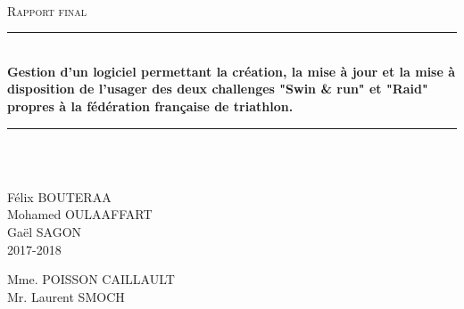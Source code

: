 \documentclass[12pt,a4paper]{report}
\newcommand{\HRule}{\rule{\linewidth}{0.5mm}}
\begin{document}
	
\begin{titlepage}
	\begin{sffamily}
		\begin{center}
			\begin{figure}
				
			\end{figure}
			
			\\[1cm]
			
			\textsc{\Large Rapport final}\\[1.5cm]
			
			\HRule \\[0.4cm]
			{ \huge \bfseries Gestion d'un logiciel permettant la création, la mise à jour et la mise à disposition de l'usager des deux challenges "Swin \& run" et "Raid" propres à la fédération française de triathlon. \\[0.4cm] }
			\HRule \\[1.5cm]
			
			\\[5cm]
			
			
			\begin{flushleft}
				Félix BOUTERAA \\
				Mohamed OULAAFFART \\
				Gaël SAGON \\
				2017-2018 \\
			\end{flushleft}  
			
			\begin{flushright}
				Mme. POISSON CAILLAULT\\
				Mr.  Laurent SMOCH 
			\end{flushright}  
			
		\end{center}
	\end{sffamily}
\end{titlepage}
\end{document}
